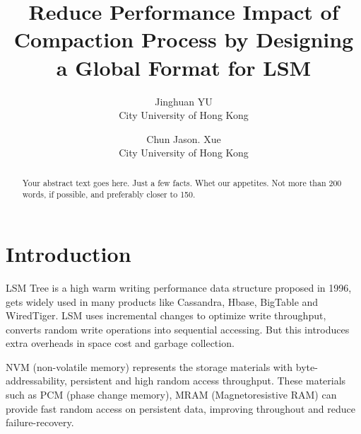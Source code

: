 \usepackage{filecontents}




\date{}

\title{\Large \bf Reduce Performance Impact of Compaction Process by Designing a Global Format for LSM}

\author{
{\rm Jinghuan YU}\\
City University of Hong Kong
\and
{\rm Chun Jason. Xue}\\
City University of Hong Kong
} %

\maketitle

\begin{abstract}
Your abstract text goes here. Just a few facts. Whet our appetites.
Not more than 200 words, if possible, and preferably closer to 150.
\end{abstract}


\section{Introduction}

LSM Tree is a high warm writing performance data structure proposed in 1996\cite{o1996log}, gets widely used in many products like  Cassandra\cite{ApacheCa22:online}, Hbase\cite{ApacheHB26:online}, BigTable\cite{chang2008bigtable} and WiredTiger\cite{WiredTig38:online}. LSM uses incremental changes to optimize write throughput, converts random write operations into sequential accessing. But this introduces extra overheads in space cost and garbage collection. 

NVM (non-volatile memory) represents the storage materials with byte-addressability, persistent and high random access throughput. These materials such as PCM (phase change memory), MRAM (Magnetoresistive RAM) can provide fast random access on persistent data, improving throughout and reduce failure-recovery. 

